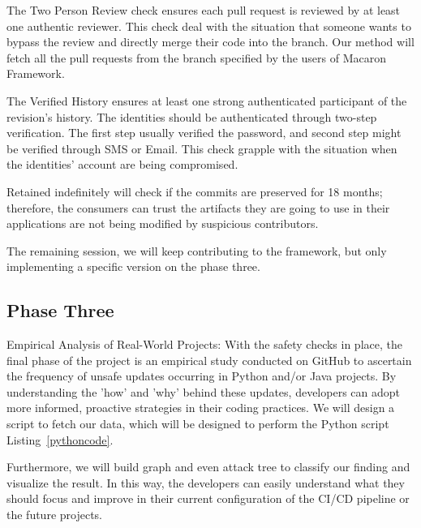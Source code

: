 The Two Person Review check ensures each pull request is reviewed by at least one authentic reviewer.
This check deal with the situation that someone wants to bypass the review and directly merge 
their code into the branch. Our method will fetch all the pull requests from the branch 
specified by the users of Macaron Framework.

The Verified History ensures at least one strong authenticated participant of the revision's history.
The identities should be authenticated through two-step verification. The first step usually 
verified the password, and second step might be verified through SMS or Email. This check grapple
with the situation when the identities' account are being compromised.

Retained indefinitely will check if the commits are preserved for 18 months; therefore, the
consumers can trust the artifacts they are going to use in their applications are not being 
modified by suspicious contributors.

The remaining session, we will keep contributing to the framework, but only implementing a
specific version on the phase three.
\subsection{Phase Three}
Empirical Analysis of Real-World Projects: With the safety checks in place, 
the final phase of the project is an empirical study conducted on GitHub to ascertain
the frequency of unsafe updates occurring in Python and/or Java projects.
By understanding the 'how' and 'why' behind these updates, developers can adopt more 
informed, proactive strategies in their coding practices. We will design a script to fetch
our data, which will be designed to perform the Python script Listing~\ref{pythoncode}.

Furthermore, we will build graph and even attack tree to classify our finding and visualize 
the result. In this way, the developers can easily understand what they should focus 
and improve in their current configuration of the CI/CD pipeline or the future projects.

